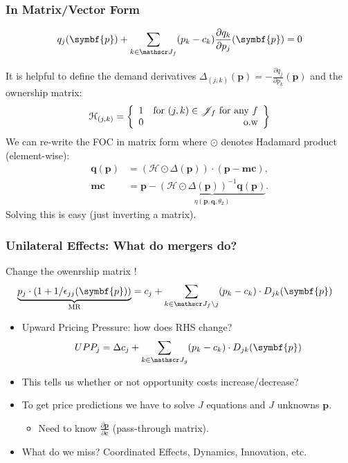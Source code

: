 \documentclass[aspectratio=169,10pt]{beamer}
\begin{document}
\begin{frame}[plain]
\frametitle{In Matrix/Vector Form}
\begin{align*}
q_j(\symbf{p}) + \sum_{k \in \calJ_f} (p_k - c_k) \frac{\partial q_{k}}{\partial p_j}(\symbf{p}) =0
\end{align*}

It is helpful to define the \alert{demand derivatives} $\Delta_{(j,k)}(\symbf{p})  = - \frac{\partial q_{j}}{\partial p_k}(\symbf{p})$ and the \alert{ownership matrix}:
\begin{align*}
\mathcal{H}_{(j,k)} = \left\{\begin{array}{lr}
          1 & \text{for }  (j,k) \in \mathscr{J}_f \text{ for any } f \\ 
      0 & \text{o.w}\\
        \end{array} \right\}
\end{align*}
We can re-write the FOC in matrix form where $\odot$ denotes Hadamard product (element-wise):
\begin{align*}
        \symbf{q}(\symbf{p}) &= (\mathcal{H} \odot \Delta(\symbf{p})) \cdot (\symbf{p} - \symbf{mc}), \\
       \symbf{mc} &=  \symbf{p} - \underbrace{(\mathcal{H} \odot \Delta(\symbf{p}))^{-1} \symbf{q}(\symbf{p})}_{\eta(\symbf{p},\symbf{q},\theta_2)}.
\end{align*}
Solving this is easy (just inverting a matrix).
\end{frame}


\begin{frame}
\frametitle{Unilateral Effects: What do mergers do?}
Change the owenrship matrix !
\begin{align*}
\underbrace{p_j\cdot\left(1+1/\epsilon_{jj}(\symbf{p})\right)}_{\text{MR}} &=  c_j + \sum_{k \in \calJ_{f} \setminus j}  (p_k-c_k) \cdot  D_{jk} (\symbf{p})
\end{align*}
\begin{itemize}
    \item \alert{Upward Pricing Pressure}: how does RHS change?
     $$UPP_j = \Delta c_j + \sum_{k \in \calJ_{g}}  (p_k-c_k) \cdot  D_{jk} (\symbf{p})$$
     \item This tells us whether or not \alert{opportunity costs} increase/decrease?
     \item To get price predictions we have to solve $J$ equations and $J$ unknowns $\symbf{p}$.
     \begin{itemize}
        \item Need to know $\frac{\partial \symbf{p}}{\partial \symbf{c}}$ (pass-through matrix).
    \end{itemize}
    \item What do we miss? \alert{Coordinated Effects}, \alert{Dynamics}, \alert{Innovation}, etc.
\end{itemize}
\end{frame}
\end{document}
